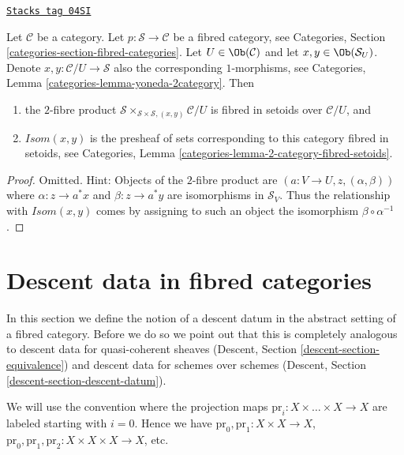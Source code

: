 \begin{lemma}
\label{stacks-lemma-isom-as-2-fibre-product}
\href{https://stacks.math.columbia.edu/tag/04SI}{\texttt{Stacks tag 04SI}}

Let $\mathcal{C}$ be a category.
Let $p : \mathcal{S} \to \mathcal{C}$ be a fibred category,
see Categories, Section \ref{categories-section-fibred-categories}.
Let $U \in \Ob(\mathcal{C})$ and let $x, y \in \Ob(\mathcal{S}_U)$.
Denote $x, y : \mathcal{C}/U \to \mathcal{S}$ also the corresponding
$1$-morphisms, see
Categories, Lemma \ref{categories-lemma-yoneda-2category}.
Then
\begin{enumerate}
\item the $2$-fibre product
$\mathcal{S} \times_{\mathcal{S} \times \mathcal{S}, (x, y)} \mathcal{C}/U$
is fibred in setoids over $\mathcal{C}/U$, and
\item $\mathit{Isom}(x, y)$ is the presheaf of sets corresponding
to this category fibred in setoids, see
Categories, Lemma \ref{categories-lemma-2-category-fibred-setoids}.
\end{enumerate}
\end{lemma}

\begin{proof}
Omitted. Hint: Objects of the $2$-fibre product are
$(a : V \to U, z, (\alpha, \beta))$ where
$\alpha : z \to a^*x$ and $\beta : z \to a^*y$ are isomorphisms
in $\mathcal{S}_V$. Thus the relationship with $\mathit{Isom}(x, y)$
comes by assigning to such an object the isomorphism
$\beta \circ \alpha^{-1}$.
\end{proof}

\section{Descent data in fibred categories}
\label{stacks-section-descent-data}
In this section we define the notion of a descent datum
in the abstract setting of a fibred category. Before we
do so we point out that this is completely analogous to
descent data for quasi-coherent sheaves
(Descent, Section \ref{descent-section-equivalence})
and descent data for schemes over schemes
(Descent, Section \ref{descent-section-descent-datum}).

\medskip\noindent
We will use the convention where the projection maps
$\text{pr}_i : X \times \ldots \times X \to X$
are labeled starting with $i = 0$. Hence we have
$\text{pr}_0, \text{pr}_1 : X \times X  \to X$,
$\text{pr}_0, \text{pr}_1, \text{pr}_2 : X \times X \times X  \to X$,
etc.

